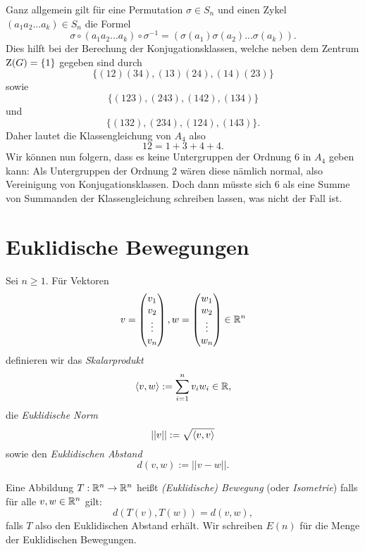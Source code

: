\documentclass{book}
\begin{document}
\begin{exa}
    Ganz allgemein gilt für eine Permutation $\sigma \in S_n$ und einen Zykel $(a_1 a_2 ... a_k) \in S_n$ die Formel
    \[
        \sigma \circ (a_1 a_2 ... a_k) \circ \sigma^{-1} = (\sigma(a_1) \sigma(a_2) ... \sigma(a_k)).
    \]
    Dies hilft bei der Berechung der Konjugationsklassen, welche neben dem Zentrum $\operatorname{Z}(G) = \{1\}$ gegeben sind durch
    \[
        \{(12)(34),(13)(24),(14)(23)\}
    \]
    sowie 
    \[
        \{(123),(243),(142),(134)\}
    \]
    und
    \[
        \{(132),(234),(124),(143)\}.
    \]
    Daher lautet die Klassengleichung von $A_4$ also
    \[
        12 = 1 + 3 + 4 + 4.
    \]
    Wir können nun folgern, dass es keine Untergruppen der Ordnung $6$ in $A_4$
    geben kann: Als Untergruppen der Ordnung $2$ wären diese nämlich normal,
    also Vereinigung von Konjugationsklassen. Doch dann müsste sich $6$ als
    eine Summe von Summanden der Klassengleichung schreiben lassen, was nicht
    der Fall ist. 
\end{exa}

\section{Euklidische Bewegungen}%
\label{sec:euklidische_bewegungen}

Sei $n \ge 1$. Für Vektoren
\[
    v = \begin{pmatrix}  v_1\\ v_2 \\ \vdots \\ v_n \end{pmatrix},
    w = \begin{pmatrix}  w_1\\ w_2 \\ \vdots \\ w_n \end{pmatrix} \in \mathbb{R}^n
\]
definieren wir das \emph{Skalarprodukt}
\[
    \langle  v,w  \rangle := \sum_{i=1}^n v_i w_i \in \mathbb{R},
\]
die \emph{Euklidische Norm} 
\[
    ||v|| := \sqrt{\langle v,v \rangle}
\]
sowie den \emph{Euklidischen Abstand}
\[
    d(v,w) := || v-w ||.
\]

\begin{defi}
    \label{defi:bewegung}
    Eine Abbildung $T: \mathbb{R}^n \to \mathbb{R}^n$ heißt \emph{(Euklidische) Bewegung} (oder \emph{Isometrie}) falls für alle $v,w \in \mathbb{R}^n$ gilt:
    \[
        d(T(v),T(w)) = d(v,w),
    \]
    falls $T$ also den Euklidischen Abstand erhält. Wir schreiben $E(n)$ für die Menge der Euklidischen Bewegungen. 
\end{defi}
\end{document}
